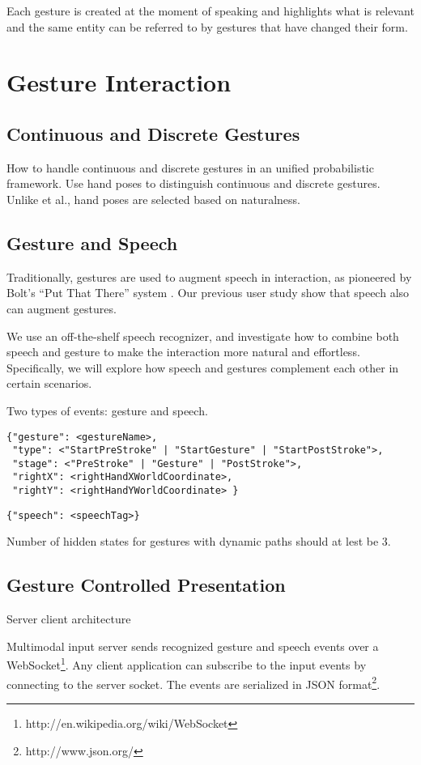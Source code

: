 \begin{savequote}[120mm]
Each gesture is created at the moment of speaking and highlights what is
relevant and the same entity can be referred to by gestures that have changed
their form.
\end{savequote}
\chapter{Gesture Interaction}
\section{Continuous and Discrete Gestures}
How to handle continuous and discrete gestures in an unified probabilistic
framework. Use hand poses to distinguish continuous and discrete gestures.
Unlike \cite{Oka02} et al., hand poses are selected based on naturalness.

\section{Gesture and Speech}
Traditionally, gestures are used to augment speech in interaction, as pioneered
by Bolt's ``Put That There'' system \cite{Bolt80}. Our previous user study
\cite{yin10thesis} show that speech also can augment gestures.

We use an off-the-shelf speech 
recognizer, and investigate how to combine both speech and gesture to make
the interaction more natural and effortless. Specifically, we will explore how speech and gestures complement each other in certain scenarios.

Two types of events: gesture and speech.

\begin{lstlisting}[caption=Gesture event JSON object]
{"gesture": <gestureName>, 
 "type": <"StartPreStroke" | "StartGesture" | "StartPostStroke">,
 "stage": <"PreStroke" | "Gesture" | "PostStroke">,
 "rightX": <rightHandXWorldCoordinate>,
 "rightY": <rightHandYWorldCoordinate> } 
\end{lstlisting}

\begin{lstlisting}[caption=Speech event JSON object]
{"speech": <speechTag>}
\end{lstlisting}

Number of hidden states for gestures with dynamic paths should at lest be 3.

\section{Gesture Controlled Presentation}
Server client architecture

Multimodal input server sends recognized gesture and speech events over a
WebSocket\footnote{http://en.wikipedia.org/wiki/WebSocket}. Any client
application can subscribe to the input events by connecting to the server
socket. The events are serialized in JSON format\footnote{http://www.json.org/}. 
